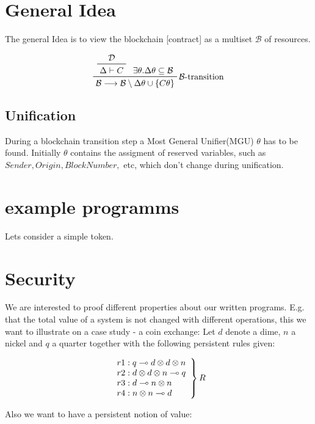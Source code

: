 \documentclass[sigconf]{acmart}
\begin{document}
\section{General Idea}

The general Idea is to view the blockchain [contract] as a multiset $\mathcal{B}$ of resources.

\begin{equation}
  \prftree[r]
  {$\mathcal{B}$-transition}
  {
    \prftree
    {
      \mathcal{D}
    } {
      \Delta\vdash C
    }
  }
  {\exists\theta.\Delta\theta\subseteq\mathcal{B}}
  {\mathcal{B}\longrightarrow\mathcal{B}\setminus\Delta\theta\cup\{C\theta\}}
\end{equation}

\subsection{Unification}
During a blockchain transition step a Most General Unifier(MGU) $\theta$ has to be found. Initially $\theta$ contains the assigment of reserved variables, such as $Sender, Origin, BlockNumber, $ etc, which don't change during unification.


\section{example programms}

Lets consider a simple token.


\section{Security}
We are interested to proof different properties about our written programs. E.g. that the total value of a system is not changed with different operations, this we want to illustrate on a case study - a coin exchange:
Let $d$ denote a dime, $n$ a nickel and $q$ a quarter together with the following persistent rules given:

\[\left.\\
\begin{array}{l}
r1: q\multimap d\otimes d\otimes n \\
r2: d\otimes d\otimes n\multimap q \\
r3: d\multimap n\otimes n \\
r4: n\otimes n\multimap d \\
\end{array}
\right\} R\]

Also we want to have a persistent notion of value:
\end{document}
